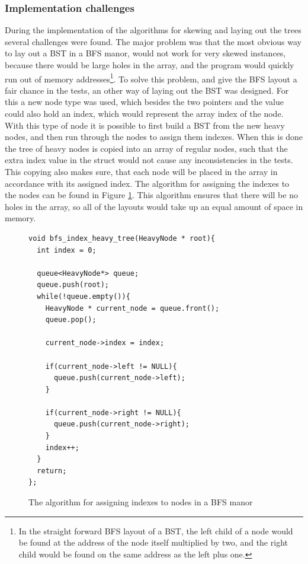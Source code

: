 \documentclass{article}
\begin{document}
\subsubsection{Implementation challenges}
During the implementation of the algorithms for skewing and laying out the trees several challenges were found. The major problem was that the most obvious way to lay out a BST in a BFS manor, would not work for very skewed instances, because there would be large holes in the array, and the program would quickly run out of memory addresses\footnote{In the straight forward BFS layout of a BST, the left child of a node would be found at the address of the node itself multiplied by two, and the right child would be found on the same address as the left plus one.}. To solve this problem, and give the BFS layout a fair chance in the tests, an other way of laying out the BST was designed. For this a new node type was used, which besides the two pointers and the value could also hold an index, which would represent the array index of the node. With this type of node it is possible to first build a BST from the new heavy nodes, and then run through the nodes to assign them indexes. When this is done the tree of heavy nodes is copied into an array of regular nodes, such that the extra index value in the struct would not cause any inconsistencies in the tests. This copying also makes sure, that each node will be placed in the array in accordance with its assigned index. The algorithm for assigning the indexes to the nodes can be found in Figure \ref{code:bfs_index}. This algorithm ensures that there will be no holes in the array, so all of the layouts would take up an equal amount of space in memory.

\begin{figure}[H]
	\centering
	\begin{lstlisting}
void bfs_index_heavy_tree(HeavyNode * root){
  int index = 0;

  queue<HeavyNode*> queue;
  queue.push(root);
  while(!queue.empty()){
    HeavyNode * current_node = queue.front();
    queue.pop();

    current_node->index = index;

    if(current_node->left != NULL){
      queue.push(current_node->left);
    }

    if(current_node->right != NULL){
      queue.push(current_node->right);
    }
    index++;
  }
  return;
};
	\end{lstlisting}	
	\caption{The algorithm for assigning indexes to nodes in a BFS manor}
	\label{code:bfs_index}
\end{figure}
\end{document}
